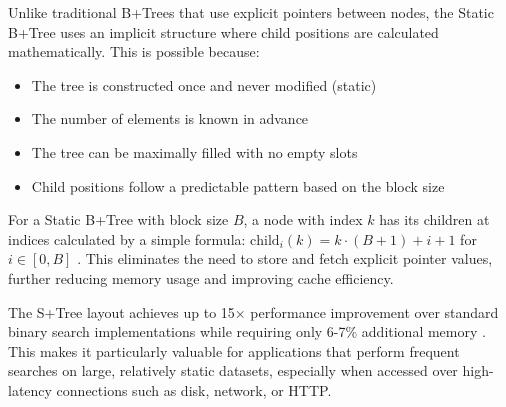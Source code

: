 Unlike traditional B+Trees that use explicit pointers between nodes, the Static B+Tree uses an implicit structure where child positions are calculated mathematically. This is possible because:

\begin{itemize}
    \item The tree is constructed once and never modified (static)
    \item The number of elements is known in advance
    \item The tree can be maximally filled with no empty slots
    \item Child positions follow a predictable pattern based on the block size
\end{itemize}

For a Static B+Tree with block size $B$, a node with index $k$ has its children at indices calculated by a simple formula: $\text{child}_i(k) = k \cdot (B+1) + i + 1$ for $i \in [0, B]$ \citep{static_b_trees}. This eliminates the need to store and fetch explicit pointer values, further reducing memory usage and improving cache efficiency.

The S+Tree layout achieves up to 15× performance improvement over standard binary search implementations while requiring only 6-7\% additional memory \citep{static_b_trees}. This makes it particularly valuable for applications that perform frequent searches on large, relatively static datasets, especially when accessed over high-latency connections such as disk, network, or HTTP.
